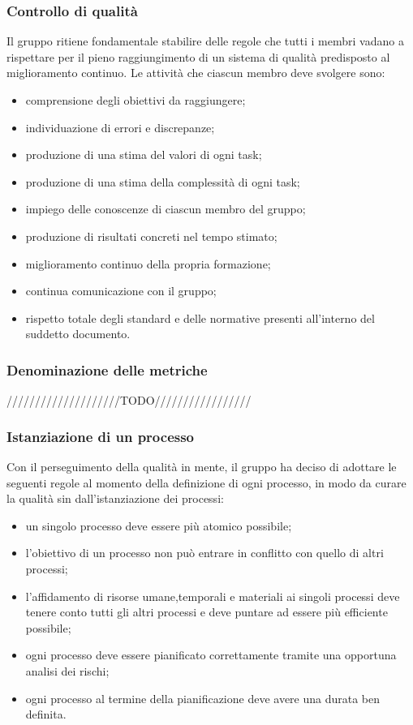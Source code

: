 \subsubsection{Controllo di qualità}
Il gruppo \textit{\Gruppo{}} ritiene fondamentale stabilire delle regole che tutti i membri vadano a rispettare per il pieno raggiungimento di un sistema di qualità predisposto al miglioramento continuo.
Le attività che ciascun membro deve svolgere sono:
\begin{itemize}
	\item comprensione degli obiettivi da raggiungere;
	\item individuazione di errori e discrepanze;
	\item produzione di una stima del valori di ogni task;
	\item produzione di una stima della complessità di ogni task;
	\item impiego delle conoscenze di ciascun membro del gruppo;
	\item produzione di risultati concreti nel tempo stimato;
	\item miglioramento continuo della propria formazione;
	\item continua comunicazione con il gruppo;
	\item rispetto totale degli standard e delle normative presenti all'interno del suddetto documento.
\end{itemize} 
\subsubsection{Denominazione delle metriche}
////////////////////TODO/////////////////
\subsubsection{Istanziazione di un processo}
Con il perseguimento della qualità in mente, il gruppo \Gruppo{} ha deciso di adottare le seguenti regole al momento della definizione di ogni processo, in modo da curare la qualità sin dall'istanziazione dei processi:
\begin{itemize}
	\item un singolo processo deve essere più atomico possibile;
	\item l'obiettivo di un processo non può entrare in conflitto con quello di altri processi;
	\item l'affidamento di risorse umane,temporali e materiali ai singoli processi deve tenere conto tutti gli altri processi e deve puntare ad essere più efficiente possibile;
	\item ogni processo deve essere pianificato correttamente tramite una opportuna analisi dei rischi;
	\item ogni processo al termine della pianificazione deve avere una durata ben definita.
\end{itemize}
